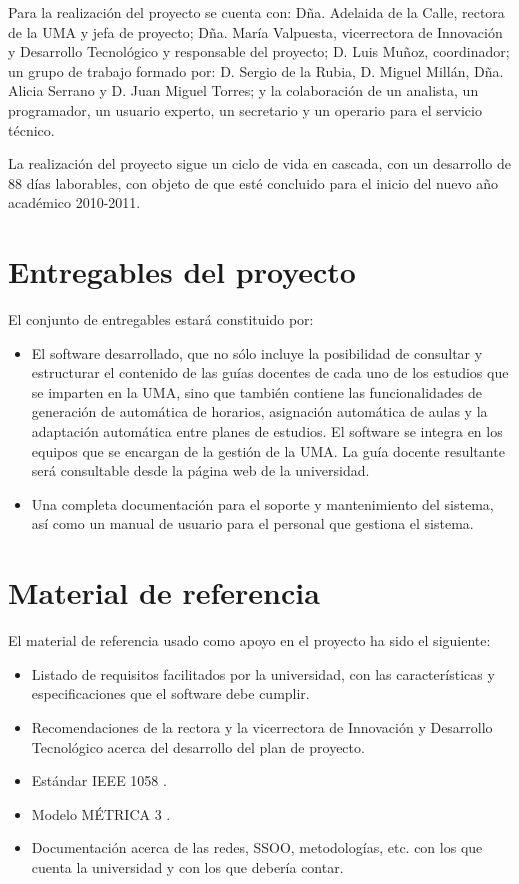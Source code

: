 \documentclass[11pt,a4paper,spanish,twoside]{report}
\begin{document}
Para la realización del proyecto se cuenta con: Dña. Adelaida de la Calle, 
rectora de la UMA y jefa de proyecto; Dña. María Valpuesta, vicerrectora de 
Innovación y Desarrollo Tecnológico y responsable del proyecto; D. Luis 
Muñoz, coordinador; un grupo de trabajo formado por: D. Sergio de la Rubia, 
D. Miguel Millán, Dña. Alicia Serrano y D. Juan Miguel Torres; y la 
colaboración de un analista, un programador, un usuario experto, un 
secretario y un operario para el servicio técnico.

La realización del proyecto sigue un ciclo de vida en cascada, con un 
desarrollo de 88 días laborables, con objeto de que esté concluido para el 
inicio del nuevo año académico 2010-2011.

\section{Entregables del proyecto}
El conjunto de entregables estará constituido por:
\begin{itemize}
\item El software desarrollado, que no sólo incluye la posibilidad de
  consultar y estructurar el contenido de las guías docentes de cada uno de
  los estudios que se imparten en la UMA, sino que también contiene las
  funcionalidades de generación de automática de horarios, asignación
  automática de aulas y la adaptación automática entre planes de estudios. El
  software se integra en los equipos que se encargan de la gestión de la
  UMA. La guía docente resultante será consultable desde la página web de la
  universidad.
\item Una completa documentación para el soporte y mantenimiento del sistema,
  así como un manual de usuario para el personal que gestiona el sistema. 
\end{itemize}

\section{Material de referencia}
El material de referencia usado como apoyo en el proyecto ha sido el siguiente:
\begin{itemize}
\item Listado de requisitos facilitados por la universidad, con las 
  características y especificaciones que el software debe cumplir.
\item Recomendaciones de la rectora y la vicerrectora de Innovación y 
  Desarrollo Tecnológico acerca del desarrollo del plan de proyecto.
\item Estándar IEEE 1058 \cite{ieee}.
\item Modelo MÉTRICA 3 \cite{met}.
\item Documentación acerca de las redes, SSOO, metodologías, etc. con los que 
  cuenta la universidad y con los que debería contar.
\end{itemize}
\end{document}

